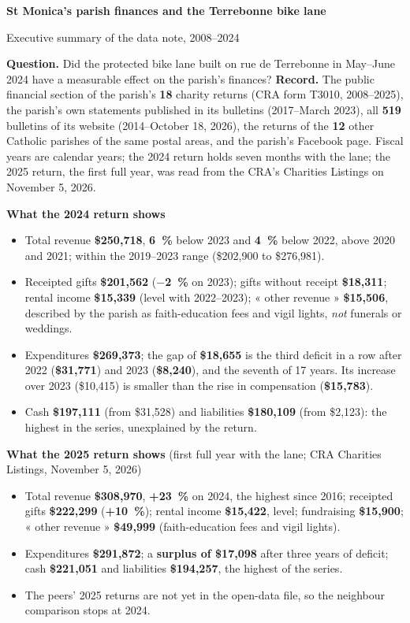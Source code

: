 \documentclass[10pt,letterpaper]{article}
\newcommand{\B}[1]{\textbf{#1}}
\begin{document}
{\LARGE\bfseries St Monica's parish finances and the Terrebonne bike lane}\par\smallskip
{\large Executive summary of the data note, 2008--2024}\par\medskip

\textbf{Question.} Did the protected bike lane built on rue de Terrebonne in May--June 2024 have a measurable effect on the parish's finances? \textbf{Record.} The public financial section of the parish's \B{18} charity returns (CRA form T3010, 2008--2025), the parish's own statements published in its bulletins (2017--March 2023), all \B{519} bulletins of its website (2014--October 18, 2026), the returns of the \B{12} other Catholic parishes of the same postal areas, and the parish's Facebook page. Fiscal years are calendar years; the 2024 return holds seven months with the lane; the 2025 return, the first full year, was read from the CRA's Charities Listings on November 5, 2026.

\textbf{What the 2024 return shows}
\begin{itemize}[nosep,leftmargin=1.2em]
\item Total revenue \B{\$250,718}, \B{6~\%} below 2023 and \B{4~\%} below 2022, above 2020 and 2021; within the 2019--2023 range (\$202,900 to \$276,981).
\item Receipted gifts \B{\$201,562} (\B{$-$2~\%} on 2023); gifts without receipt \B{\$18,311}; rental income \B{\$15,339} (level with 2022--2023); « other revenue » \B{\$15,506}, described by the parish as faith-education fees and vigil lights, \emph{not} funerals or weddings.
\item Expenditures \B{\$269,373}; the gap of \B{\$18,655} is the third deficit in a row after 2022 (\B{\$31,771}) and 2023 (\B{\$8,240}), and the seventh of 17 years. Its increase over 2023 (\$10,415) is smaller than the rise in compensation (\B{\$15,783}).
\item Cash \B{\$197,111} (from \$31,528) and liabilities \B{\$180,109} (from \$2,123): the highest in the series, unexplained by the return.
\end{itemize}

\textbf{What the 2025 return shows} (first full year with the lane; CRA Charities Listings, November 5, 2026)
\begin{itemize}[nosep,leftmargin=1.2em]
\item Total revenue \B{\$308,970}, \B{+23~\%} on 2024, the highest since 2016; receipted gifts \B{\$222,299} (\B{+10~\%}); rental income \B{\$15,422}, level; fundraising \B{\$15,900}; « other revenue » \B{\$49,999} (faith-education fees and vigil lights).
\item Expenditures \B{\$291,872}; a \B{surplus of \$17,098} after three years of deficit; cash \B{\$221,051} and liabilities \B{\$194,257}, the highest of the series.
\item The peers' 2025 returns are not yet in the open-data file, so the neighbour comparison stops at 2024.
\end{itemize}
\end{document}
